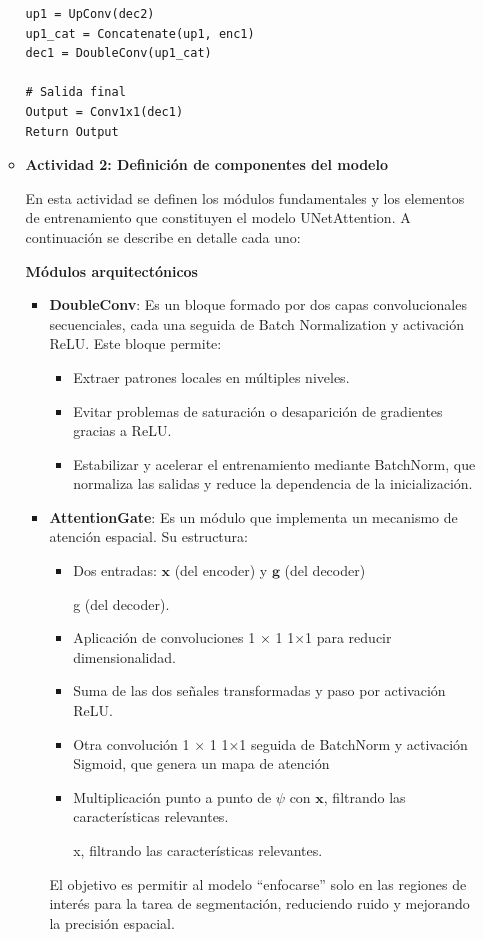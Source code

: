 \begin{enumerate}
\begin{itemize}
\begin{verbatim}
up1 = UpConv(dec2)
up1_cat = Concatenate(up1, enc1)
dec1 = DoubleConv(up1_cat)

# Salida final
Output = Conv1x1(dec1)
Return Output
\end{verbatim}

  \item\textbf{Actividad 2: Definición de componentes del modelo}

  En esta actividad se definen los módulos fundamentales y los elementos de entrenamiento que constituyen el modelo UNetAttention. A continuación se describe en detalle cada uno:

\textbf{Módulos arquitectónicos}

\begin{itemize}
\item \textbf{DoubleConv}:
Es un bloque formado por dos capas convolucionales secuenciales, cada una seguida de Batch Normalization y activación ReLU.
Este bloque permite:
\begin{itemize}
\item Extraer patrones locales en múltiples niveles.
\item Evitar problemas de saturación o desaparición de gradientes gracias a ReLU.
\item Estabilizar y acelerar el entrenamiento mediante BatchNorm, que normaliza las salidas y reduce la dependencia de la inicialización.
\end{itemize}

\item \textbf{AttentionGate}:
Es un módulo que implementa un mecanismo de atención espacial. Su estructura:
\begin{itemize}
\item Dos entradas: 
$\mathbf{x}$ (del encoder) y $\mathbf{g}$ (del decoder)

g (del decoder).
\item Aplicación de convoluciones 
1
×
1
1×1 para reducir dimensionalidad.
\item Suma de las dos señales transformadas y paso por activación ReLU.
\item Otra convolución 
1
×
1
1×1 seguida de BatchNorm y activación Sigmoid, que genera un mapa de atención 
\item Multiplicación punto a punto de $\psi$ con $\mathbf{x}$, filtrando las características relevantes.

x, filtrando las características relevantes.
\end{itemize}
El objetivo es permitir al modelo “enfocarse” solo en las regiones de interés para la tarea de segmentación, reduciendo ruido y mejorando la precisión espacial.


\end{itemize}
\end{itemize}
\end{enumerate}

